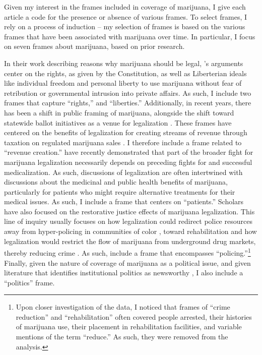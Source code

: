 Given my interest in the frames included in coverage of marijuana, I give each article a code for the presence or absence of various frames. To select frames, I rely on a process of induction -- my selection of frames is based on the various frames that have been associated with marijuana over time. In particular, I focus on seven frames about marijuana, based on prior research. 

In their work describing reasons why marijuana should be legal, \citet{rosenthal_and_kubby_1996}'s arguments center on the rights, as given by the Constitution, as well as Liberterian ideals like individual freedom and personal liberty to use marijuana without fear of retribution or governmental intrusion into private affairs. As such, I include two frames that capture ``rights,'' and ``liberties.''  Additionally, in recent years, there has been a shift in public framing of marijuana, alongside the shift toward statewide ballot initiatives as a venue for legalization \citep{mosher_and_akins_2019}. These frames have centered on the benefits of legalization for creating streams of revenue through taxation on regulated marijuana sales \citep{caulkins_et_al_2012,miron_2010}. I therefore include a frame related to ``revenue creation.'' \citet{newhart_and_dolphin_2018} have recently demonstrated that part of the broader fight for marijuana legalization necessarily depends on preceding fights for and successful medicalization. As such, discussions of legalization are often intertwined with discussions about the medicinal and public health benefits of marijuana, particularly for patients who might require alternative treatments for their medical issues. As such, I include a frame that centers on ``patients.'' Scholars have also focused on the restorative justice effects of marijuana legalization. This line of inquiry usually focuses on how legalization could redirect police resources away from hyper-policing in communities of color \citep{alexander_2010,davis_2003}, toward rehabilitation \citep{alexander_2010,mosher_and_akins_2019,davis_2003} and how legalization would restrict the flow of marijuana from underground drug markets, thereby reducing crime \citep{mosher_and_akins_2019,caulkins_et_al_2012}. 
As such, include a frame that encompasses ``policing.''\footnote{Upon closer investigation of the data, I noticed that frames of ``crime reduction'' and ``rehabilitation'' often covered people arrested, their histories of marijuana use, their placement in rehabilitation facilities, and variable mentions of the term ``reduce.'' As such, they were removed from the analysis.} %
Finally, given the nature of coverage of marijuana as a political issue, and given literature that identifies institutional politics as newsworthy \citep{amenta_et_al_2012,galtung_and_ruge_1965}, I also include a ``politics'' frame.

